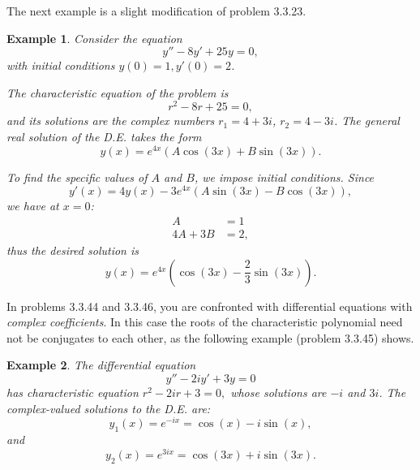 \documentclass[11pt]{amsart}
\newtheorem{example}{Example}
\numberwithin{equation}{section}
\begin{document}
The next example is a slight modification of problem 3.3.23.
\begin{example}
Consider the equation
\begin{equation*}
    y''-8y'+25y = 0,
\end{equation*}
with initial conditions $y(0)=1, y'(0)=2$.

The characteristic equation of the problem is 
\begin{equation*}
    r^2-8r+25=0, 
\end{equation*}
and its solutions are the complex numbers $r_1=4+3i$, $r_2=4-3i$.  The general real solution of the D.E. takes the form
\begin{equation*}
y(x)=e^{4x}(A\cos(3x)+B\sin(3x)).
\end{equation*}

To find the specific values of $A$ and $B$, we impose initial conditions.  Since  
\begin{equation*}
    y'(x)=4y(x)-3e^{4x}(A\sin(3x)-B\cos(3x)),
\end{equation*}
we have at $x=0$: 
\begin{align*}
    A  & = 1\\
    4A+3B & = 2,
\end{align*}
thus the desired solution is 
\begin{equation*}
    y(x)=e^{4x}\left(\cos(3x)-\frac{2}{3}\sin(3x)\right).
\end{equation*}
\end{example}

In problems 3.3.44 and 3.3.46, you are confronted with differential equations with {\emph{complex coefficients}}. In this case the roots of the characteristic polynomial need not be conjugates to each other, as the following example (problem 3.3.45) shows. 

\begin{example}
The differential equation
\begin{equation*}
    y''-2iy'+3y =0
\end{equation*}
has characteristic equation $r^2-2ir+3=0,$ whose solutions are $-i$ and $3i$.  The complex-valued solutions to the D.E. are:
\begin{equation*}
    y_1(x)= e^{-ix} = \cos(x)-i\sin(x),
\end{equation*}
and 
\begin{equation*}
    y_2(x)= e^{3ix} = \cos(3x) + i\sin(3x).
\end{equation*}
\end{example}
\end{document}

